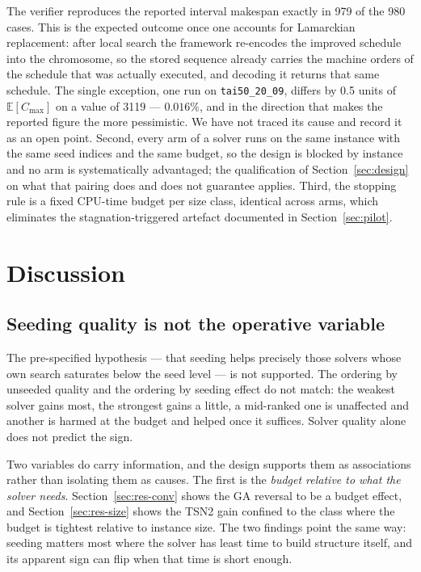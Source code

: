 \documentclass[review]{elsarticle}
\begin{document}
The verifier reproduces the reported interval makespan exactly in 979 of
the 980 cases. This is the expected outcome once one accounts for
Lamarckian replacement: after local search the framework re-encodes the
improved schedule into the chromosome, so the stored sequence already
carries the machine orders of the schedule that was actually executed, and
decoding it returns that same schedule. The single exception, one run on
\texttt{tai50\_20\_09}, differs by 0.5 units of $\mathbb{E}[C_{\max}]$ on a
value of 3119 --- $0.016\%$, and in the direction that makes the reported
figure the more pessimistic. We have not traced its cause and record it as
an open point. Second, every arm of a solver runs on the same instance
with
the same seed indices and the same budget, so the design is blocked by
instance and no arm is systematically advantaged; the qualification of
Section~\ref{sec:design} on what that pairing does and does not guarantee
applies. Third, the stopping rule is a fixed CPU-time budget per size
class, identical across arms, which eliminates the stagnation-triggered
artefact documented in Section~\ref{sec:pilot}.

\section{Discussion}\label{sec:discussion}

\subsection{Seeding quality is not the operative variable}

The pre-specified hypothesis --- that seeding helps precisely those solvers
whose own search saturates below the seed level --- is not supported. The
ordering by unseeded quality and the ordering by seeding effect do not
match: the weakest solver gains most, the strongest gains a little, a
mid-ranked one is unaffected and another is harmed at the budget and helped
once it suffices. Solver quality alone does not predict the sign.

Two variables do carry information, and the design supports them as
associations rather than isolating them as causes. The first is the
\emph{budget relative to what the solver needs}. Section~\ref{sec:res-conv}
shows the GA reversal to be a budget effect, and Section~\ref{sec:res-size}
shows the TSN2 gain confined to the class where the budget is tightest
relative to instance size. The two findings point the same way: seeding
matters most where the solver has least time to build structure itself, and
its apparent sign can flip when that time is short enough.
\end{document}
